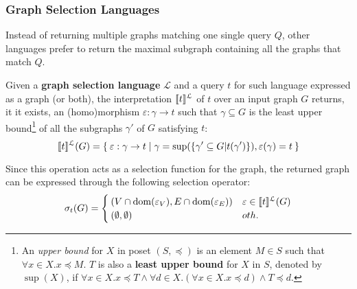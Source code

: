 \subsubsection{Graph Selection Languages}
Instead of returning multiple graphs matching one single query $Q$, other languages prefer to return the maximal subgraph containing all the graphs that match $Q$. 

\begin{definition}\label{def:travselect}
  Given a \textbf{graph selection language } $\mathcal{L}$ and a query $t$ for such language expressed as a graph (or both),
the interpretation $[\! [t]\!]^{\mathcal{L}}$ of $t$ over an input graph $G$ returns, it it exists, an (homo)morphism $\varepsilon:\gamma\to t$ such that $\gamma\subseteq G$ is the least upper bound\footnote{An \textit{upper bound} for $X$ in poset $(S,\preceq)$ is an element $M \in S$ such that $\forall x \in X. x \preceq M$. $T$ is also a \textbf{least upper bound} for $X$ in $S$, denoted by $\sup(X)$, if $\forall x\in X. x\preceq T\wedge \forall d\in X. (\forall x\in X. x\preceq d)\wedge T\preceq d$.} of all the subgraphs $\gamma'$ of $G$ satisfying $t$:
\[[\! [t]\!]^{\mathcal{L}}(G)=\Set{\varepsilon:\gamma\to t| \gamma = \sup(\{\gamma'\subseteq G|t(\gamma')\}), \varepsilon(\gamma)=t}\]

Since this operation acts as a selection function for the graph, the returned graph can be expressed through the following selection operator:
\[\sigma_t(G)=\begin{cases}
  (V\cap \operatorname{dom}(\varepsilon_V),E\cap \operatorname{dom}(\varepsilon_E)) & \varepsilon \in [\! [t]\!]^{\mathcal{L}}(G)\\
  (\emptyset,\emptyset) & oth.
\end{cases}\]
\end{definition}

